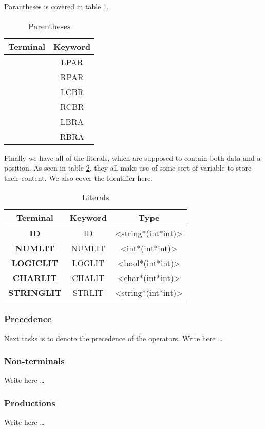 \documentclass[10pt]{article}
\begin{document}
Parantheses is covered in table \ref{tab:parentheses}.

\begin{table}[h!]
\centering
\begin{tabular}{c|c}
Terminal & Keyword \\
\hline
\text{(} & LPAR \\
\text{)} & RPAR \\
\text{\{} & LCBR \\
\text{\}} & RCBR \\
\text{[} & LBRA \\
\text{]} & RBRA \\
\end{tabular}
\caption{\label{tab:parentheses}Parentheses}
\end{table}

Finally we have all of the literals, which are supposed to contain both data and a position. As seen in table \ref{tab:literals}, they all make use of some sort of variable to store their content. We also cover the Identifier here.

\begin{table}[!h]
\centering
\begin{tabular}{c|cc}
Terminal & Keyword & Type\\
\hline
\textbf{ID} & ID & <string*(int*int)>\\
\textbf{NUMLIT} & NUMLIT & <int*(int*int)>\\
\textbf{LOGICLIT} & LOGLIT & <bool*(int*int)> \\
\textbf{CHARLIT} & CHALIT & <char*(int*int)> \\
\textbf{STRINGLIT} & STRLIT & <string*(int*int)> \\
\end{tabular}
\caption{\label{tab:literals}Literals}
\end{table}

\subsubsection{Precedence}
Next tasks is to denote the precedence of the operators.
Write here \ldots

\subsubsection{Non-terminals}
Write here \ldots

\subsubsection{Productions}
Write here \ldots
\end{document}
